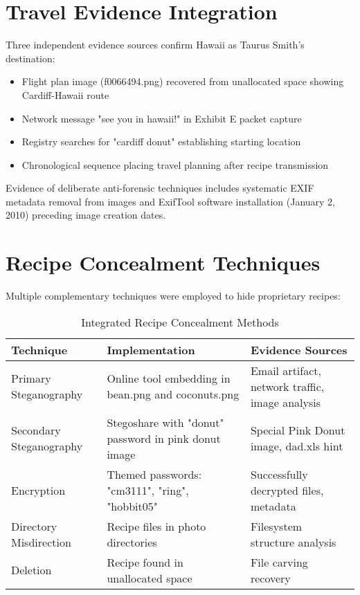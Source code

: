 \section{Travel Evidence Integration}
Three independent evidence sources confirm Hawaii as Taurus Smith's destination:

\begin{itemize}
    \item Flight plan image (f0066494.png) recovered from unallocated space showing Cardiff-Hawaii route
    \item Network message "see you in hawaii!" in Exhibit E packet capture
    \item Registry searches for "cardiff donut" establishing starting location
    \item Chronological sequence placing travel planning after recipe transmission
\end{itemize}

Evidence of deliberate anti-forensic techniques includes systematic EXIF metadata removal from images and ExifTool software installation (January 2, 2010) preceding image creation dates.

\section{Recipe Concealment Techniques}
Multiple complementary techniques were employed to hide proprietary recipes:

\begin{table}[htbp]
\centering
\small
\begin{tabular}{|p{3cm}|p{5cm}|p{6cm}|}
\hline
\textbf{Technique} & \textbf{Implementation} & \textbf{Evidence Sources} \\
\hline
Primary Steganography & Online tool embedding in bean.png and coconuts.png & Email artifact, network traffic, image analysis \\
\hline
Secondary Steganography & Stegoshare with "donut" password in pink donut image & Special Pink Donut image, dad.xls hint \\
\hline
Encryption & Themed passwords: "cm3111", "ring", "hobbit05" & Successfully decrypted files, metadata \\
\hline
Directory Misdirection & Recipe files in photo directories & Filesystem structure analysis \\
\hline
Deletion & Recipe found in unallocated space & File carving recovery \\
\hline
\end{tabular}
\caption{Integrated Recipe Concealment Methods}
\label{table:concealment_methods}
\end{table}

